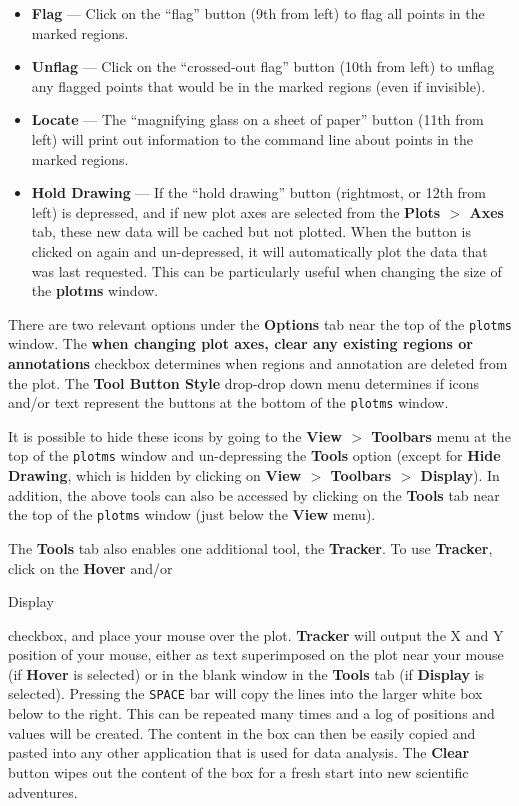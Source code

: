 \begin{itemize}
\item {\bf Flag} --- Click on the ``flag'' button (9th from left) to flag all points in the marked regions.

\item {\bf Unflag} --- Click on the ``crossed-out flag'' button (10th from left) to unflag any flagged points that would be in the marked regions (even if invisible).

\item {\bf Locate} --- The ``magnifying glass on a sheet of paper'' button (11th from left) will print out information to the command line about points in the marked regions.  

\item {\bf Hold Drawing} --- If the ``hold drawing'' button (rightmost, or 12th from left) is depressed, and if new plot axes are selected from the {\bf Plots $>$ Axes} tab, these new data will be cached but not plotted. When the button is clicked on again and un-depressed, it will automatically plot the data that was last requested. This can be particularly useful when changing the size of the {\bf plotms} window.
\end{itemize}

There are two relevant options under the {\bf Options} tab near the top of the {\tt plotms} window. The {\bf when changing plot axes, clear any existing regions or annotations} checkbox determines when regions and annotation are deleted from the plot. The {\bf Tool Button Style} drop-drop down menu determines if icons and/or text represent the buttons at the bottom of the {\tt plotms} window. 

It is possible to hide these icons by going to the {\bf View $>$ Toolbars} menu at the top of the {\tt plotms} window and un-depressing the {\bf Tools} option (except for {\bf Hide Drawing}, which is hidden by clicking on {\bf View $>$ Toolbars $>$ Display}). In addition, the above tools can also be accessed by clicking on the {\bf Tools} tab near the top of the {\tt plotms} window (just below the {\bf View} menu). 

The {\bf Tools} tab also enables one additional tool, the {\bf
  Tracker}. To use {\bf Tracker}, click on the {\bf Hover} and/or {\bf

  Display} checkbox, and place your mouse over the plot. {\bf Tracker}
will output the X and Y position of your mouse, either as text
superimposed on the plot near your mouse (if {\bf Hover} is selected)
or in the blank window in the {\bf Tools} tab (if {\bf Display} is
selected). Pressing the {\tt SPACE} bar will copy the lines into the
larger white box below to the right. This can be repeated many times
and a log of positions and values will be created. The content in the
box can then be easily copied and pasted into any other application
that is used for data analysis. The {\bf Clear} button wipes out the
content of the box for a fresh start into new scientific adventures.



